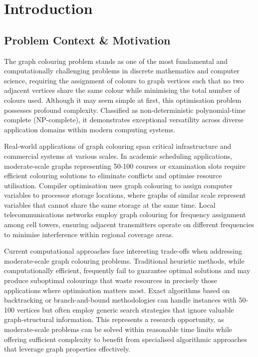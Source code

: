 \section{Introduction}

\subsection{Problem Context \& Motivation}

The graph colouring problem stands as one of the most fundamental and computationally challenging problems in discrete mathematics and computer science, requiring the assignment of colours to graph vertices such that no two adjacent vertices share the same colour while minimising the total number of colours used. Although it may seem simple at first, this optimisation problem possesses profound complexity. Classified as non-deterministic polynomial-time complete (NP-complete), it demonstrates exceptional versatility across diverse application domains within modern computing systems.

Real-world applications of graph colouring span critical infrastructure and commercial systems at various scales. In academic scheduling applications, moderate-scale graphs representing 50-100 courses or examination slots require efficient colouring solutions to eliminate conflicts and optimise resource utilisation. Compiler optimisation uses graph colouring to assign computer variables to processor storage locations, where graphs of similar scale represent variables that cannot share the same storage at the same time. Local telecommunications networks employ graph colouring for frequency assignment among cell towers, ensuring adjacent transmitters operate on different frequencies to minimise interference within regional coverage areas.

Current computational approaches face interesting trade-offs when addressing moderate-scale graph colouring problems. Traditional heuristic methods, while computationally efficient, frequently fail to guarantee optimal solutions and may produce suboptimal colourings that waste resources in precisely those applications where optimisation matters most. Exact algorithms based on backtracking or branch-and-bound methodologies can handle instances with 50-100 vertices but often employ generic search strategies that ignore valuable graph-structural information. This represents a research opportunity, as moderate-scale problems can be solved within reasonable time limits while offering sufficient complexity to benefit from specialised algorithmic approaches that leverage graph properties effectively.

